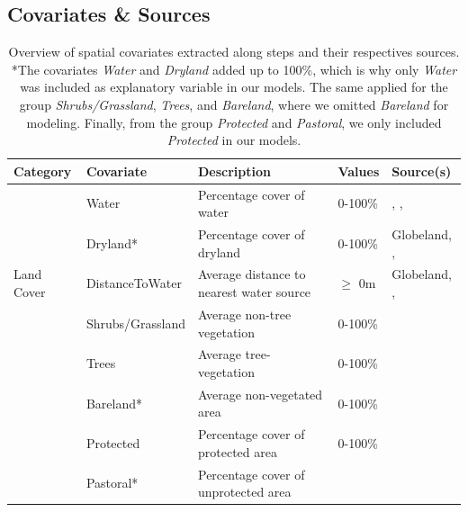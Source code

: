\documentclass[abstract=on,10pt,a4paper,bibliography=totocnumbered]{scrartcl}
\begin{document}
\newpage
\subsection{Covariates \& Sources}

\begin{table}[h]
  \begin{center}
    \caption{Overview of spatial covariates extracted along steps and their
    respectives sources. *The covariates \textit{Water} and \textit{Dryland}
    added up to 100\%, which is why only \textit{Water} was included as
    explanatory variable in our models. The same applied for the group
    \textit{Shrubs/Grassland}, \textit{Trees}, and \textit{Bareland}, where we
    omitted \textit{Bareland} for modeling. Finally, from the group
    \textit{Protected} and \textit{Pastoral}, we only included
    \textit{Protected} in our models.}
    \label{Appendix:Sources}
    \resizebox{\textwidth}{!} {
      \begin{tabular}{lllll}
      \hline
      Category &
        Covariate &
          Description &
            Values &
              Source(s) \\
      \midrule
      \multirow{5}{*}{Land Cover}
        & Water
          & Percentage cover of water
            & 0-100\%
              & \cite{Chen.2015}, \cite{Schaaf.2015}, \cite{Yamazaki.2019} \\
        & Dryland*
          & Percentage cover of dryland
            & 0-100\%
              & Globeland, \cite{Schaaf.2015}, \cite{Yamazaki.2019} \\
        & DistanceToWater
          & Average distance to nearest water source
            & \(\geq\) 0m
              & Globeland, \cite{Schaaf.2015}, \cite{Yamazaki.2019} \\
        & Shrubs/Grassland
          & Average non-tree vegetation
            & 0-100\%
              & \cite{Dimiceli.2015} \\
        & Trees
          & Average tree-vegetation
            & 0-100\%
              & \cite{Dimiceli.2015} \\
        & Bareland*
          & Average non-vegetated area
            & 0-100\%
              & \cite{Dimiceli.2015} \\
      \hdashline
      \multirow{2}{*}{Protection Status}
        & Protected
          & Percentage cover of protected area
            & 0-100\%
              & \cite{PeaceParks.2019} \\
        & Pastoral*
          & Percentage cover of unprotected area

\end{tabular}}
\end{center}
\end{table}
\end{document}
